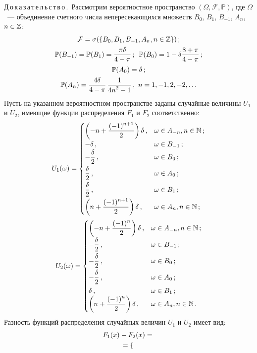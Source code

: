 \begin{multicols}{2}
\noindent
Д\,о\,к\,а\,з\,а\,т\,е\,л\,ь\,с\,т\,в\,о\,.\ 
Рассмотрим вероятностное пространство
$(\Omega,\mathcal{F},\mathbb{P})$, где $\Omega$~--- объединение
счетного числа непересекающихся множеств $B_0$, $B_1$, $B_{-1}$,
$A_n$, $n\hm\in\mathbb{Z}$:
\begin{gather*}
\mathcal{F} = \sigma(\{B_0, B_1, B_{-1}, A_n, n\in\mathbb{Z}\})\,;
\\
\mathbb{P}(B_{-1}) = \mathbb{P}(B_{ 1}) = \displaystyle\frac{\displaystyle  \pi \delta\mathstrut}{\displaystyle 4-\pi\mathstrut}\,; \enskip
\mathbb{P}(B_{0}) = 1- \delta \frac{8 + \pi}{4 - \pi} \,;
\\
\mathbb{P}(A_{0}) =  \delta\,;\\
\mathbb{P}(A_{n}) = \displaystyle\frac{\displaystyle 4 \delta
\mathstrut}{\displaystyle 4-\pi\mathstrut} \,\displaystyle\frac{\displaystyle 1\mathstrut}{\displaystyle 4n^2 - 1 \mathstrut}\,,  \ n = 1, -1,  2, -2, \ldots
\end{gather*}
Пусть на указанном вероятностном пространстве заданы случайные
величины $U_1$ и $U_2$, имеющие функции распределения $F_1$ и $F_2$
соответственно:
$$
U_1(\omega)=
\begin{cases}
    \left(-n+\displaystyle\frac{\displaystyle (-1)^{n+1}\mathstrut}{\displaystyle 2\mathstrut}\right)\delta\,,     & \omega\in A_{-n}, n\in\mathbb{N}\,;\\
    -\delta\,,            & \omega\in B_{-1}\,;\\
    -\displaystyle\frac{\displaystyle \delta\mathstrut}{\displaystyle 2\mathstrut}\,,  & \omega\in B_0\,;\\
    \displaystyle\frac{\displaystyle \delta\mathstrut}{\displaystyle 2\mathstrut}\,,  & \omega\in A_0\,;\\
    \displaystyle\frac{\displaystyle \delta\mathstrut}{\displaystyle 2\mathstrut}\,,   & \omega\in B_1\,;\\
    \left(n+\displaystyle\frac{\displaystyle (-1)^{n+1}\mathstrut}{\displaystyle 2\mathstrut}\right)\delta\,,      & \omega\in A_n, n\in\mathbb{N}\,;
\end{cases}
$$
$$
U_2(\omega)=
\begin{cases}
    \left(-n+\displaystyle\frac{\displaystyle (-1)^{n}\mathstrut}{\displaystyle 2\mathstrut}\right)\delta\,,     & \omega\in A_{-n}, n\in\mathbb{N}\,;\\
    -\displaystyle\frac{\displaystyle \delta\mathstrut}{\displaystyle 2\mathstrut}\,,            & \omega\in B_{-1}\,;\\
    -\displaystyle\frac{\displaystyle \delta\mathstrut}{\displaystyle 2\mathstrut}\,,  & \omega\in B_0\,;\\
    -\displaystyle\frac{\displaystyle \delta\mathstrut}{\displaystyle 2\mathstrut}\,,  & \omega\in A_0\,;\\
    \delta\,,   & \omega\in B_1\,;\\
    \left(n+\displaystyle\frac{\displaystyle (-1)^{n}\mathstrut}{\displaystyle 2\mathstrut}\right)\delta\,,      & \omega\in A_n, n\in\mathbb{N}\,.
\end{cases}
$$
Разность функций распределения случайных величин $U_1$ и  $U_2$ имеет вид:
\begin{multline*}
F_1(x) - F_2(x)={}\\
\hspace*{-1mm}{}=
\begin{cases}

\end{cases}
\end{multline*}
\end{multicols}
